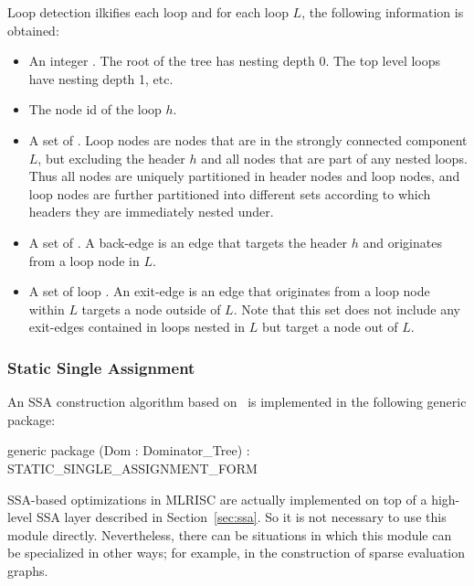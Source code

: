 Loop detection ilkifies each loop and for 
each loop $L$, the following information is obtained:
\begin{itemize}
 \item An integer .   The root of the tree has nesting
 depth 0.  The top level loops have nesting depth 1, etc.
 \item The node id of the loop  $h$.
 \item A set of .  Loop nodes are
  nodes that are in the strongly connected
  component $L$, but excluding the header $h$ 
  and all nodes that are part of any nested loops.
   Thus all nodes are uniquely partitioned in header nodes and
   loop nodes, and loop nodes are further partitioned into different
   sets according to which headers they are immediately nested under.
 \item A set of .  A back-edge is an
    edge that targets the header $h$ and originates from a loop node
    in $L$.
 \item A set of loop . An exit-edge is an edge
   that originates from a loop node within $L$
   targets a node outside of $L$.  Note that this set does not include
   any exit-edges contained in loops nested in $L$ but 
   target a node out of $L$.
\end{itemize}

\subsubsection{Static Single Assignment}

An SSA construction algorithm based on~\cite{SSA,Briggs-SSA,linear-time-IDF}
is implemented in the following generic package:
\begin{SML}
  generic package 
     (Dom : Dominator_Tree) : STATIC_SINGLE_ASSIGNMENT_FORM
\end{SML}

SSA-based optimizations in MLRISC
are actually implemented on top of a
high-level SSA layer described in Section~\ref{sec:ssa}. 
So it is not necessary to use this module directly.  Nevertheless,
there can be situations in which this module can be specialized in other
ways; for example, in the construction of sparse evaluation graphs.

